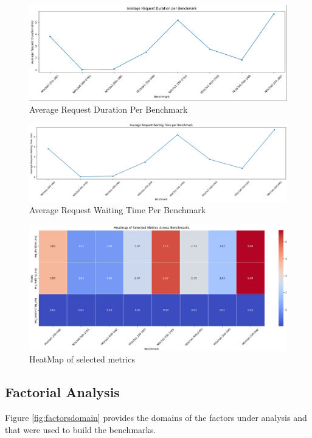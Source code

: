 \documentclass[runningheads]{llncs}
\begin{document}
\begin{figure}[H]
    \centering
    \includegraphics[width=1\textwidth]{media/Avg_req_duration.png} \caption{Average Request Duration Per Benchmark}
    \label{fig:bb}
\end{figure}

\begin{figure}[H]
    \centering
    \includegraphics[width=1\textwidth]{media/Avg_req_waitingtime.png} \caption{Average Request Waiting Time Per Benchmark}
    \label{fig:cc}
\end{figure}

\begin{figure}[H]
    \centering
    \includegraphics[width=1\textwidth]{media/heatmap_avgConnect_avgWait_avgDuration.png} \caption{HeatMap of selected metrics}
    \label{fig:fddd}
\end{figure}

\subsection{Factorial Analysis}
Figure \ref{fig:factorsdomain} provides the domains of the factors under analysis and that were used to build the benchmarks.
\end{document}
